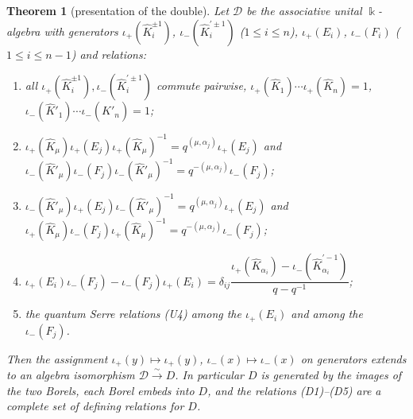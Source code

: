 \documentclass[11pt]{amsart}
\newtheorem{theorem}{Theorem}[section]
\theoremstyle{definition}
\newcommand{\BK}{\Bbbk}
\newcommand{\iop}{\iota_{+}}
\newcommand{\iom}{\iota_{-}}
\newcommand{\hK}{\hat K}
\newcommand{\al}{\alpha}
\begin{document}
\begin{theorem}[presentation of the double]\label{thm:presentation}
Let $\mathcal{D}$ be the associative unital $\BK$-algebra with generators
$\iop(\hK_i^{\pm1})$, $\iom(\hK_i^{\prime\pm1})$ ($1\le i\le n$),
$\iop(E_i)$, $\iom(F_i)$ ($1\le i\le n-1$) and relations:
\begin{enumerate}
\item[\textup{(D1)}] all $\iop(\hK_i^{\pm1}),\iom(\hK_i^{\prime\pm1})$ commute
pairwise, $\iop(\hK_1)\cdots\iop(\hK_n)=1$,
$\iom(\hK'_1)\cdots\iom(\hK'_n)=1$;
\item[\textup{(D2)}] $\iop(\hK_\mu)\iop(E_j)\iop(\hK_\mu)^{-1}
=q^{(\mu,\al_j)}\iop(E_j)$ and
$\iom(\hK'_\mu)\iom(F_j)\iom(\hK'_\mu)^{-1}=q^{-(\mu,\al_j)}\iom(F_j)$;
\item[\textup{(D3)}] $\iom(\hK'_\mu)\iop(E_j)\iom(\hK'_\mu)^{-1}
=q^{(\mu,\al_j)}\iop(E_j)$ and
$\iop(\hK_\mu)\iom(F_j)\iop(\hK_\mu)^{-1}=q^{-(\mu,\al_j)}\iom(F_j)$;
\item[\textup{(D4)}] $\iop(E_i)\iom(F_j)-\iom(F_j)\iop(E_i)
=\delta_{ij}\dfrac{\iop(\hK_{\al_i})-\iom(\hK_{\al_i}^{\prime-1})}{q-q^{-1}}$;
\item[\textup{(D5)}] the quantum Serre relations \textup{(U4)} among the
$\iop(E_i)$ and among the $\iom(F_j)$.
\end{enumerate}
Then the assignment $\iop(y)\mapsto \iop(y)$, $\iom(x)\mapsto \iom(x)$ on
generators extends to an algebra isomorphism $\mathcal{D}\xrightarrow{\sim}D$.
In particular $D$ is generated by the images of the two Borels, each Borel
embeds into $D$, and the relations \textup{(D1)--(D5)} are a complete set of
defining relations for $D$.
\end{theorem}
\end{document}
